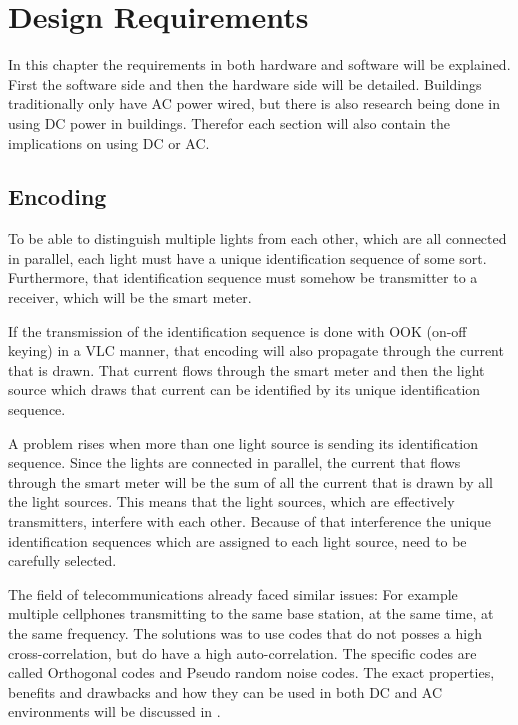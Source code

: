 
\chapter{Design Requirements}
\label{chp:design-requirements}

In this chapter the requirements in both hardware and software will be explained.
First the software side and then the hardware side will be detailed.
Buildings traditionally only have AC power wired, but there is also research being done  in using DC power in buildings. 
Therefor each section will also contain the implications on using DC or AC.


	\section{Encoding}

	To be able to distinguish multiple lights from each other, which are all connected in parallel, each light must have a unique identification sequence of some sort.
	Furthermore, that identification sequence must somehow be transmitter to a receiver, which will be the smart meter.


	If the transmission of the identification sequence is done with OOK (on-off keying) in a VLC manner, that encoding will also propagate through the current that is drawn.
	That current flows through the smart meter and then the light source which draws that current can be identified by its unique identification sequence. 


	A problem rises when more than one light source is sending its identification sequence.
	Since the lights are connected in parallel, the current that flows through the smart meter will be the sum of all the current that is drawn by all the light sources.
	This means that the light sources, which are effectively transmitters, interfere with each other.
	Because of that interference the unique identification sequences which are assigned to each light source, need to be carefully selected.


	The field of telecommunications already faced similar issues: For example multiple cellphones transmitting to the same base station, at the same time, at the same frequency. 
	The solutions was to use codes that do not posses a high cross-correlation, but do have a high auto-correlation.
	The specific codes are called Orthogonal codes and Pseudo random noise codes.
	The exact properties, benefits and drawbacks and how they can be used in both DC and AC environments will be discussed in .




